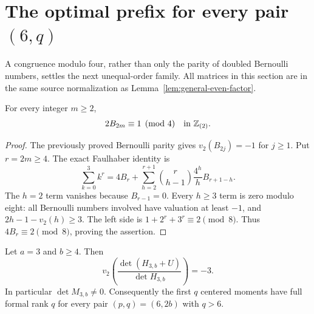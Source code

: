 \section{The optimal prefix for every pair \texorpdfstring{$(6,q)$}{(6,q)}}
\label{rs:section}

A congruence modulo four, rather than only the parity of doubled
Bernoulli numbers, settles the next unequal-order family.  All matrices
in this section are in the same source normalization as
Lemma~\ref{lem:general-even-factor}.

\begin{lemma}\label{rs:Bernoulli-mod-four}
For every integer $m\ge2$,
\[
 2B_{2m}\equiv1\pmod4\quad\hbox{in }\mathbb Z_{(2)}.
\]
\end{lemma}
\begin{proof}
The previously proved Bernoulli parity gives $v_2(B_{2j})=-1$
for $j\ge1$. Put $r=2m\ge4$. The exact Faulhaber identity is
\[
 \sum_{k=0}^3k^r
 =4B_r+\sum_{h=2}^{r+1}
          \binom r{h-1}\frac{4^h}{h}B_{r+1-h}.
\]
The $h=2$ term vanishes because $B_{r-1}=0$. Every $h\ge3$ term
is zero modulo eight: all Bernoulli numbers involved have valuation
at least $-1$, and
$2h-1-v_2(h)\ge3$. The left side is
$1+2^r+3^r\equiv2\pmod8$.
Thus $4B_r\equiv2\pmod8$, proving the assertion.
\end{proof}

\begin{theorem}\label{rs:main}
Let $a=3$ and $b\ge4$. Then
\[
 v_2\!\left(\frac{\det(H_{3,b}+U)}{\det H_{3,b}}\right)=-3.
\]
In particular $\det M_{3,b}\ne0$. Consequently the first $q$
centered moments have full formal rank $q$ for every pair
$(p,q)=(6,2b)$ with $q>6$.
\end{theorem}

